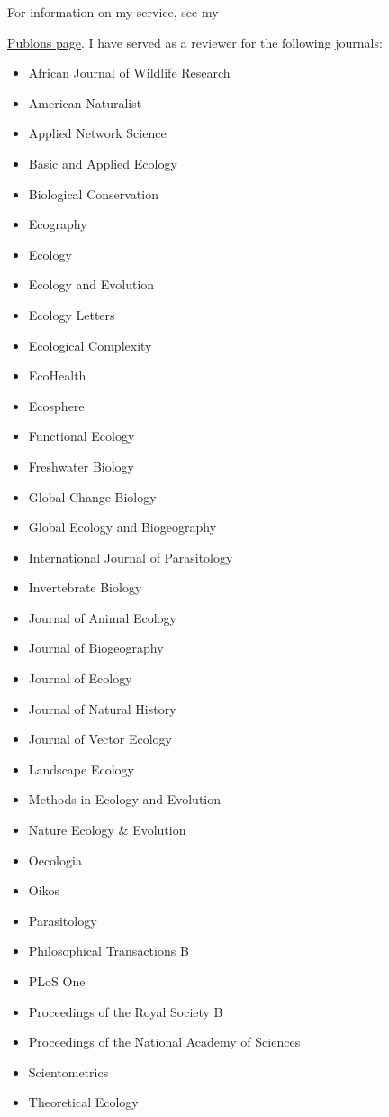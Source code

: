 \documentclass[]{CV}
\begin{document}
For information on my service, see my {\href{https://publons.com/author/904038/tad-dallas#profile}{Publons page}. I have served as a reviewer for the following journals:

\begin{multicols}{2}
\begin{itemize}
 \item African Journal of Wildlife Research
 \item American Naturalist
 \item Applied Network Science
 \item Basic and Applied Ecology
 \item Biological Conservation
 \item Ecography
 \item Ecology
 \item Ecology and Evolution
 \item Ecology Letters
 \item Ecological Complexity
 \item EcoHealth
 \item Ecosphere
 \item Functional Ecology
 \item Freshwater Biology
 \item Global Change Biology
 \item Global Ecology and Biogeography
 \item International Journal of Parasitology
 \item Invertebrate Biology
 \item Journal of Animal Ecology
 \item Journal of Biogeography
 \item Journal of Ecology
 \item Journal of Natural History
 \item Journal of Vector Ecology
 \item Landscape Ecology
 \item Methods in Ecology and Evolution
 \item Nature Ecology \& Evolution
 \item Oecologia
 \item Oikos
 \item Parasitology
 \item Philosophical Transactions B
 \item PLoS One
 \item Proceedings of the Royal Society B
 \item Proceedings of the National Academy of Sciences
 \item Scientometrics
 \item Theoretical Ecology
\end{itemize}
\end{multicols}



}
\end{document}

